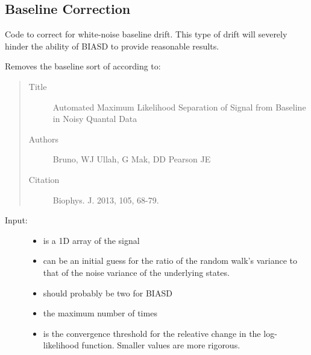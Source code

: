 \documentclass[letterpaper,10pt,english]{sphinxmanual}
\begin{document}
\subsection{Baseline Correction}
\label{code_utils:baseline-correction}
Code to correct for white-noise baseline drift. This type of drift will severely hinder the ability of BIASD to provide reasonable results.
\label{code_utils:module-utils.baseline}

\begin{fulllineitems}
\label{code_utils:utils.baseline.remove_baseline}
Removes the baseline sort of according to:
\begin{quote}\begin{description}
\item[{Title}] \leavevmode
Automated Maximum Likelihood Separation of Signal from Baseline in Noisy Quantal Data

\item[{Authors}] \leavevmode
Bruno, WJ
Ullah, G
Mak, DD
Pearson JE

\item[{Citation}] \leavevmode
Biophys. J. 2013, 105, 68-79.

\end{description}\end{quote}
\begin{description}
\item[{Input:}] \leavevmode\begin{itemize}
\item {} 
 is a 1D array of the signal

\item {} 
 can be an initial guess for the ratio of the random walk's variance to that of the noise variance of the underlying states.

\item {} 
 should probably be two for BIASD

\item {} 
 the maximum number of times

\item {} 
 is the convergence threshold for the releative change in the log-likelihood function. Smaller values are more rigorous.


\end{itemize}
\end{description}
\end{fulllineitems}
\end{document}
